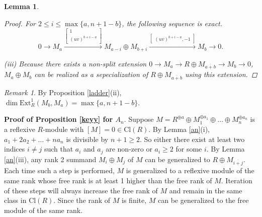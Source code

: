 \documentclass{amsart}[12pt]
\newtheorem{lemma}[theorem]{Lemma}
\theoremstyle{definition}
\theoremstyle{remark}
\newtheorem{rmk}[theorem]{Remark}
\numberwithin{equation}{section}
\begin{document}
\begin{lemma}
\begin{proof}
For $2 \leq i \leq \max\{a, n + 1 - b\}$, the following sequence is exact.
\begin{equation}\label{consecutive}
0 \to M_a \xrightarrow{\begin{bmatrix} 1 \\ (uv)^{b + i - a} \end{bmatrix}} M_{a - i} \oplus M_{b + i} \xrightarrow{\begin{bmatrix}(uv)^{b + i - a}, -1 \end{bmatrix}} M_b \to 0.
\end{equation}

(iii) Because there exists a non-split extension $0 \to M_a \to R \oplus M_{\overline{a + b}} \to M_b \to 0$, $M_a \oplus M_b$ can be realized as a sepecialization of $R \oplus M_{\overline{a + b}}$ using this extension. 
\end{proof}
\end{lemma}

\begin{rmk}
By Proposition \ref{ladder}(ii), $\dim \mathrm{Ext}_R^1(M_b, M_a) = \max \{a, n + 1 - b\}$. 
\end{rmk}

\noindent \textbf{Proof of Proposition \ref{keyy} for $A_n$}.
Suppose $M =  R^{\oplus a} \oplus M_1^{\oplus a_1} \oplus \dots \oplus M_n^{\oplus a_{n}}$ is a reflexive $R$-module with $[M] = 0 \in \mathrm{Cl}(R)$. By Lemma \ref{an}(i), $a_1 + 2a_2 + \dots + na_n$ is divisible by $n + 1 \geq 2$. So either there exist at least two indices $i \neq j$ such that $a_i$ and $a_j$ are non-zero or $a_i \geq 2$ for some $i$. By Lemma \ref{an}(iii), any rank 2 summand $M_i \oplus M_j$ of $M$ can be generalized to $R \oplus M_{\overline{i + j}}$. Each time such a step is performed, $M$ is generalized to a reflexive module of the same rank whose free rank is at least 1 higher than the free rank of $M$. Iteration of these steps will always increase the free rank of $M$ and remain in the same class in $\mathrm{Cl}(R)$. Since the rank of $M$ is finite, $M$ can be generalized to the free module of the same rank.
\end{document}
